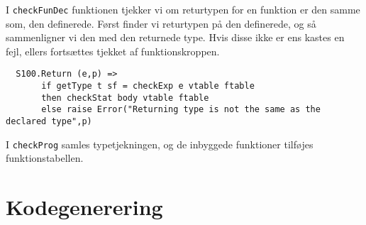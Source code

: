 \documentclass[12pt]{article}
\begin{document}
I \texttt{checkFunDec} funktionen tjekker vi om returtypen for en funktion er den samme som, den definerede. Først finder vi returtypen på den definerede, og så sammenligner vi den med den returnede type. Hvis disse ikke er ens kastes en fejl, ellers fortsættes tjekket af funktionskroppen.

\begin{verbatim}
  S100.Return (e,p) => 
       if getType t sf = checkExp e vtable ftable
       then checkStat body vtable ftable
       else raise Error("Returning type is not the same as the declared type",p)
\end{verbatim}

I \texttt{checkProg} samles typetjekningen, og de inbyggede funktioner tilføjes funktionstabellen.

\section{Kodegenerering}
\end{document}
